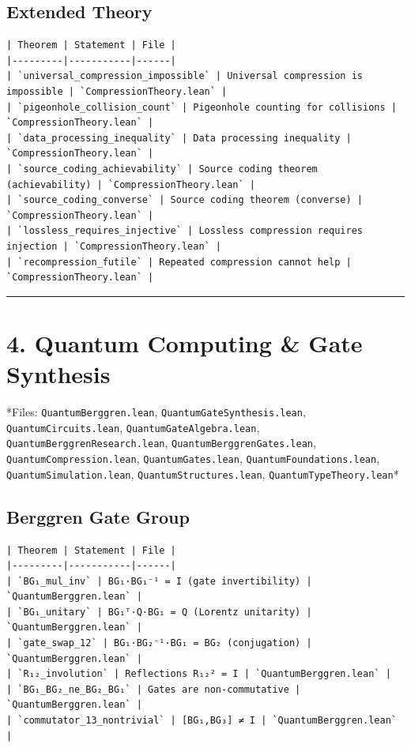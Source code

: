 \documentclass[12pt,a4paper,openany]{book}
\begin{document}
\subsection{Extended Theory}
\begin{verbatim}
| Theorem | Statement | File |
|---------|-----------|------|
| `universal_compression_impossible` | Universal compression is impossible | `CompressionTheory.lean` |
| `pigeonhole_collision_count` | Pigeonhole counting for collisions | `CompressionTheory.lean` |
| `data_processing_inequality` | Data processing inequality | `CompressionTheory.lean` |
| `source_coding_achievability` | Source coding theorem (achievability) | `CompressionTheory.lean` |
| `source_coding_converse` | Source coding theorem (converse) | `CompressionTheory.lean` |
| `lossless_requires_injective` | Lossless compression requires injection | `CompressionTheory.lean` |
| `recompression_futile` | Repeated compression cannot help | `CompressionTheory.lean` |
\end{verbatim}

\bigskip\hrule\bigskip

\section{4. Quantum Computing \& Gate Synthesis}

*Files: \texttt{QuantumBerggren.lean}, \texttt{QuantumGateSynthesis.lean}, \texttt{QuantumCircuits.lean}, \texttt{QuantumGateAlgebra.lean}, \texttt{QuantumBerggrenResearch.lean}, \texttt{QuantumBerggrenGates.lean}, \texttt{QuantumCompression.lean}, \texttt{QuantumGates.lean}, \texttt{QuantumFoundations.lean}, \texttt{QuantumSimulation.lean}, \texttt{QuantumStructures.lean}, \texttt{QuantumTypeTheory.lean}*

\subsection{Berggren Gate Group}
\begin{verbatim}
| Theorem | Statement | File |
|---------|-----------|------|
| `BG₁_mul_inv` | BG₁·BG₁⁻¹ = I (gate invertibility) | `QuantumBerggren.lean` |
| `BG₁_unitary` | BG₁ᵀ·Q·BG₁ = Q (Lorentz unitarity) | `QuantumBerggren.lean` |
| `gate_swap_12` | BG₁·BG₂⁻¹·BG₁ = BG₂ (conjugation) | `QuantumBerggren.lean` |
| `R₁₂_involution` | Reflections R₁₂² = I | `QuantumBerggren.lean` |
| `BG₁_BG₂_ne_BG₂_BG₁` | Gates are non-commutative | `QuantumBerggren.lean` |
| `commutator_13_nontrivial` | [BG₁,BG₃] ≠ I | `QuantumBerggren.lean` |
\end{verbatim}
\end{document}
